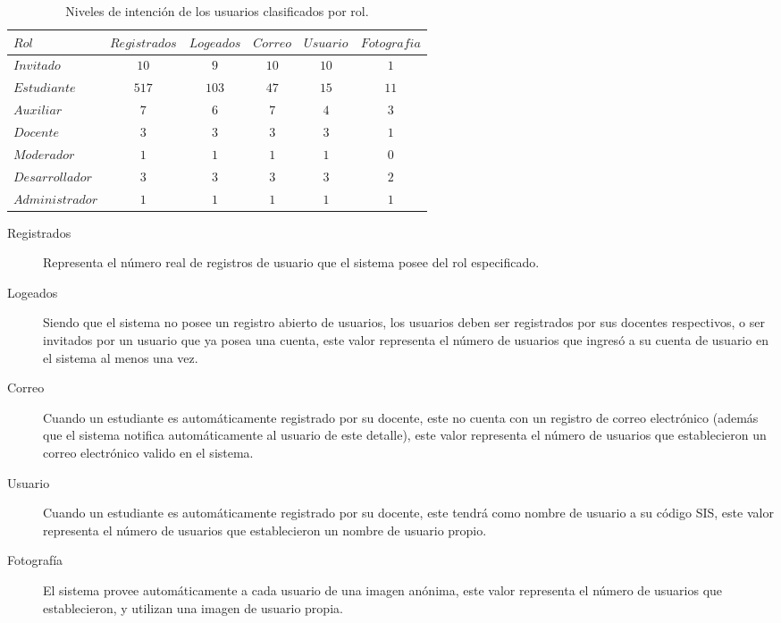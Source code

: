 \begin{table}
\centering
\begin{tabular}{l|c c c c c}
$Rol$ & $Registrados$ & $Logeados$ & $Correo$ & $Usuario$ & $Fotografia$ \\
\hline
$Invitado$      & $ 10$ & $  9$ & $10$ & $10$ & $ 1$ \\
$Estudiante$    & $517$ & $103$ & $47$ & $15$ & $11$ \\
$Auxiliar$      & $  7$ & $  6$ & $ 7$ & $ 4$ & $ 3$ \\
$Docente$       & $  3$ & $  3$ & $ 3$ & $ 3$ & $ 1$ \\
$Moderador$     & $  1$ & $  1$ & $ 1$ & $ 1$ & $ 0$ \\
$Desarrollador$ & $  3$ & $  3$ & $ 3$ & $ 3$ & $ 2$ \\
$Administrador$ & $  1$ & $  1$ & $ 1$ & $ 1$ & $ 1$ \\
\end{tabular}
\caption{Niveles de intención de los usuarios clasificados por rol.}
\label{usuarios_tabla_1}
\end{table}

\begin{description}
\item [Registrados] Representa el número real de registros de usuario que el
sistema posee del rol especificado.
\item [Logeados] Siendo que el sistema no posee un registro abierto de usuarios,
los usuarios deben ser registrados por sus docentes respectivos, o ser invitados
por un usuario que ya posea una cuenta, este valor representa el número de
usuarios que ingresó a su cuenta de usuario en el sistema al menos una vez.
\item [Correo] Cuando un estudiante es automáticamente registrado por su
docente, este no cuenta con un registro de correo electrónico (además que el
sistema notifica automáticamente al usuario de este detalle), este valor
representa el número de usuarios que establecieron un correo electrónico valido
en el sistema.
\item [Usuario] Cuando un estudiante es automáticamente registrado por su
docente, este tendrá como nombre de usuario a su código SIS, este valor
representa el número de usuarios que establecieron un nombre de usuario propio.
\item [Fotografía] El sistema provee automáticamente a cada usuario de una
imagen anónima, este valor representa el número de usuarios que establecieron,
y utilizan una imagen de usuario propia.
\end{description}

